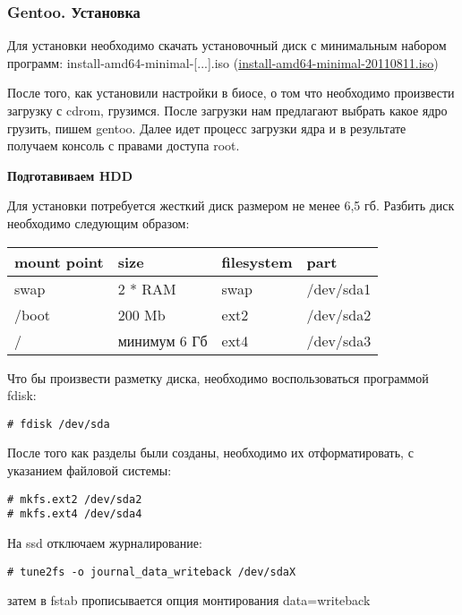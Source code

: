 \documentclass[10pt, a4paper]{article}
\begin{document}
\subsubsection{Gentoo. Установка}

Для установки необходимо скачать установочный диск с минимальным набором программ: 
install-amd64-minimal-[...].iso
(\href{http://mirror.yandex.ru/gentoo-distfiles/releases/amd64/current-iso/install-amd64-minimal-20110811.iso}{install-amd64-minimal-20110811.iso})

После того, как установили настройки в биосе, о том что необходимо произвести загрузку с cdrom, грузимся. После загрузки нам предлагают выбрать какое ядро грузить, пишем gentoo. Далее идет процесс загрузки ядра и в результате получаем консоль с правами доступа root.


{\bf Подготавиваем HDD}

Для установки потребуется жесткий диск размером не менее 6,5 гб. Разбить диск необходимо следующим образом:

\begin{center}
\tt{
\begin{tabular}{|l|l|l|l|}
\hline mount point & size & filesystem & part \\
\hline swap  & 2 * RAM & swap & /dev/sda1 \\
\hline /boot & 200 Mb & ext2  & /dev/sda2 \\
\hline / & минимум 6 Гб & ext4 & /dev/sda3 \\
\hline
\end{tabular}
}
\end{center}

Что бы произвести разметку диска, необходимо воспользоваться программой fdisk:

\begin{verbatim}
# fdisk /dev/sda
\end{verbatim}

После того как разделы были созданы, необходимо их отформатировать, с указанием файловой системы:

\begin{verbatim}
# mkfs.ext2 /dev/sda2
# mkfs.ext4 /dev/sda4
\end{verbatim}

На ssd отключаем журналирование:
\begin{verbatim}
# tune2fs -o journal_data_writeback /dev/sdaX 
\end{verbatim}
затем в fstab прописывается опция монтирования data=writeback
\end{document}
